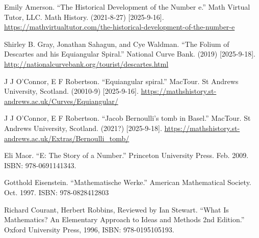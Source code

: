 Emily Amerson. ``The Historical Development of the Number e.'' Math Virtual Tutor, LLC. Math History. (2021-8-27) [2025-9-16]. \url{https://mathvirtualtutor.com/the-historical-development-of-the-number-e}

Shirley B. Gray, Jonathan Sahagun, and Cye Waldman. ``The Folium of Descartes and his Equiangular Spiral.'' National Curve Bank. (2019) [2025-9-18]. \url{http://nationalcurvebank.org/tourist/descartes.html}

J J O'Connor, E F Robertson. ``Equiangular spiral.'' MacTour. St Andrews University, Scotland. (20010-9) [2025-9-16]. \url{https://mathshistory.st-andrews.ac.uk/Curves/Equiangular/}

J J O'Connor, E F Robertson. ``Jacob Bernoulli's tomb in Basel.'' MacTour. St Andrews University, Scotland. (2021?) [2025-9-18]. \url{https://mathshistory.st-andrews.ac.uk/Extras/Bernoulli_tomb/}

Eli Maor. ``E: The Story of a Number.'' Princeton University Press. Feb. 2009. ISBN: 978-0691141343.

Gotthold Eisenstein. ``Mathematische Werke.'' American Mathematical Society. Oct. 1997. ISBN: 978-0828412803

Richard Courant, Herbert Robbins, Reviewed by Ian Stewart. ``What Is Mathematics? An Elementary Approach to Ideas and Methods 2nd Edition.'' Oxford University Press, 1996, ISBN: 978-0195105193.
